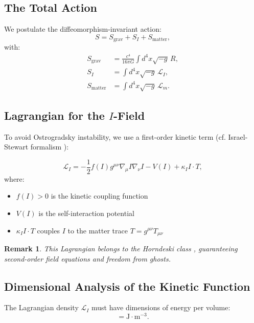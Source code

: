 \documentclass[12pt, a4paper]{article}
\newtheorem{remark}{Remark}
\begin{document}
\subsection{The Total Action}

We postulate the diffeomorphism-invariant action:
\begin{equation}
    S = S_{\text{grav}} + S_I + S_{\text{matter}},
    \label{eq:total_action}
\end{equation}
with:
\begin{align}
    S_{\text{grav}} &= \frac{c^4}{16\pi G} \int d^4x \sqrt{-g} \, R, \\
    S_I &= \int d^4x \sqrt{-g} \, \mathcal{L}_I, \\
    S_{\text{matter}} &= \int d^4x \sqrt{-g} \, \mathcal{L}_m.
\end{align}

\subsection{Lagrangian for the $I$-Field}

To avoid Ostrogradsky instability, we use a first-order kinetic term (cf. Israel-Stewart formalism \cite{Israel1979}):

\begin{equation}
    \mathcal{L}_I = -\frac{1}{2} f(I) g^{\mu\nu} \nabla_\mu I \nabla_\nu I - V(I) + \kappa_I I \cdot T,
    \label{eq:L_I}
\end{equation}
where:
\begin{itemize}
    \item $f(I) > 0$ is the kinetic coupling function
    \item $V(I)$ is the self-interaction potential
    \item $\kappa_I I \cdot T$ couples $I$ to the matter trace $T = g^{\mu\nu}T_{\mu\nu}$
\end{itemize}

\begin{remark}
This Lagrangian belongs to the Horndeski class \cite{Horndeski1974}, guaranteeing second-order field equations and freedom from ghosts.
\end{remark}

\subsection{Dimensional Analysis of the Kinetic Function}

The Lagrangian density $\mathcal{L}_I$ must have dimensions of energy per volume:
\begin{equation}
    [\mathcal{L}_I] = \text{J} \cdot \text{m}^{-3}.
\end{equation}
\end{document}
